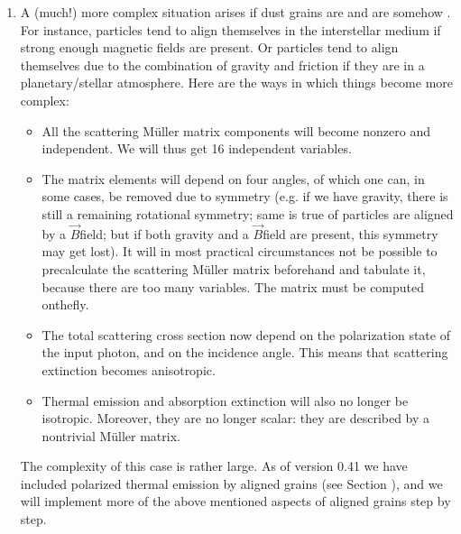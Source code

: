 \documentclass[letterpaper,10pt,english]{sphinxmanual}
\begin{document}
\begin{enumerate}
\item {} 
A (much!) more complex situation arises if dust grains are 
and are somehow . For
instance, particles tend to align themselves in the interstellar medium if
strong enough magnetic fields are present. Or particles tend to align
themselves due to the combination of gravity and friction if they are in a
planetary/stellar atmosphere. Here are the ways in which things become more
complex:
\begin{itemize}
\item {} 
All the scattering Müller matrix components will become
non\sphinxhyphen{}zero and independent. We will thus get 16 independent variables.

\item {} 
The matrix elements will depend on four angles, of which one can,
in some cases, be removed due to symmetry (e.g. if we have gravity,
there is still a remaining rotational symmetry; same is true of
particles are aligned by a \(\vec B\)\sphinxhyphen{}field; but if both gravity and a
\(\vec B\)\sphinxhyphen{}field are present, this symmetry may get lost). It will in
most practical circumstances not be possible to precalculate the
scattering Müller matrix beforehand and tabulate it, because there
are too many variables. The matrix must be computed on\sphinxhyphen{}the\sphinxhyphen{}fly.

\item {} 
The total scattering cross section now  depend on the
polarization state of the input photon, and on the incidence angle.
This means that scattering extinction becomes anisotropic.

\item {} 
Thermal emission and absorption extinction will also no longer
be isotropic. Moreover, they are no longer scalar: they are described
by a non\sphinxhyphen{}trivial Müller matrix.

\end{itemize}

The complexity of this case is rather large. As of version 0.41 we
have included polarized thermal emission by aligned grains (see
Section {\hyperref[\detokenize{dustradtrans:sec-polarized-thermal-emission}]{}}), and we will
implement more of the above mentioned aspects of aligned grains
step by step.

\end{enumerate}
\end{document}
